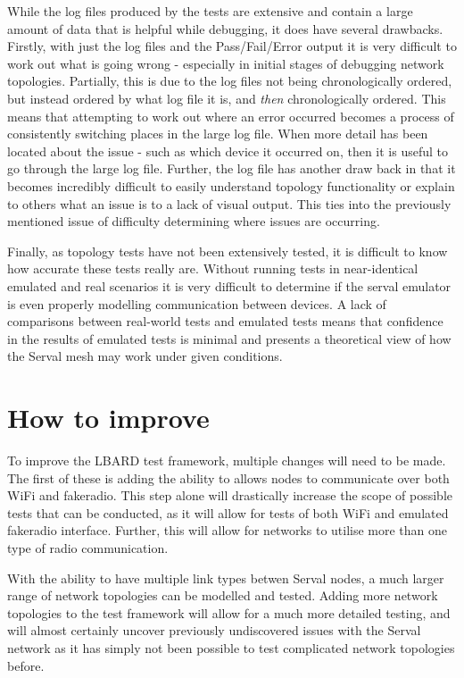 While the log files produced by the tests are extensive and contain a large amount of data that is helpful while debugging, it does have several drawbacks. 
Firstly, with just the log files and the Pass/Fail/Error output it is very difficult to work out what is going wrong - especially in initial stages of debugging network topologies.
Partially, this is due to the log files not being chronologically ordered, but instead ordered by what log file it is, and \emph{then} chronologically ordered.
This means that attempting to work out where an error occurred becomes a process of consistently switching places in the large log file.
When more detail has been located about the issue - such as which device it occurred on, then it is useful to go through the large log file.
Further, the log file has another draw back in that it becomes incredibly difficult to easily understand topology functionality or explain to others what an issue is to a lack of visual output.
This ties into the previously mentioned issue of difficulty determining where issues are occurring.

Finally, as topology tests have not been extensively tested, it is difficult to know how accurate these tests really are.
Without running tests in near-identical emulated and real scenarios it is very difficult to determine if the serval emulator is even properly modelling communication between devices. 
A lack of comparisons between real-world tests and emulated tests means that confidence in the results of emulated tests is minimal and presents a theoretical view of how the Serval mesh may work under given conditions. 


\section{How to improve}
To improve the LBARD test framework, multiple changes will need to be made.
The first of these is adding the ability to allows nodes to communicate over both WiFi and fakeradio. 
This step alone will drastically increase the scope of possible tests that can be conducted, as it will allow for tests of both WiFi and emulated fakeradio interface.
Further, this will allow for networks to utilise more than one type of radio communication.

With the ability to have multiple link types betwen Serval nodes, a much larger range of network topologies can be modelled and tested.
Adding more network topologies to the test framework will allow for a much more detailed testing, and will almost certainly uncover previously undiscovered issues with the Serval network as it has simply not been possible to test complicated network topologies before.

